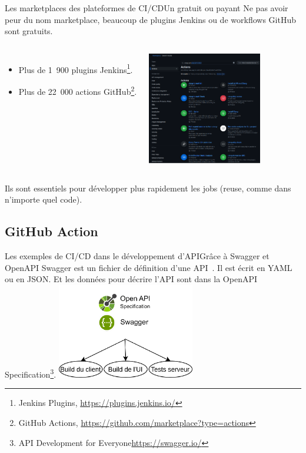 \documentclass{beamer}
\begin{document}
    \begin{frame}{Les marketplaces des plateformes de CI/CD}{Un  gratuit ou payant}
        \transdissolve
        Ne pas avoir peur du nom marketplace, beaucoup de plugins Jenkins ou de workflows GitHub sont gratuits.
        \begin{columns}
            \begin{itemize}
                \item Plus de 1~900 plugins Jenkins\footnote[frame]{Jenkins Plugins, \url{https://plugins.jenkins.io/}}.
                \item Plus de 22~000 actions GitHub\footnote[frame]{GitHub Actions, \url{https://github.com/marketplace?type=actions}}.
            \end{itemize}
            \centering
            \includegraphics[width=5cm]{image/github-marketplace}
        \end{columns}
        Ils sont essentiels pour développer plus rapidement les jobs (reuse, comme dans n'importe quel code).
    \end{frame}

    \subsection{GitHub Action}\label{subsec:github-action}
    \begin{frame}{Les exemples de CI/CD dans le développement d'API}{Grâce à Swagger et OpenAPI}
        \transdissolve
        Swagger est un fichier de définition d'une API~.
        Il est écrit en YAML ou en JSON. Et les données pour décrire l'API sont dans la OpenAPI Specification\footnote{API Development for Everyone\url{https://swagger.io/}}.
        \break
        \centering
        \includegraphics[width=6cm]{image/swagger-capacity.drawio}
    \end{frame}
\end{document}
